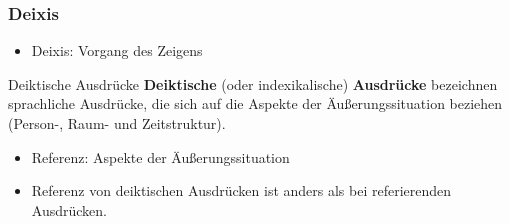 \begin{frame}
\frametitle{Deixis}

\begin{itemize}
	\item Deixis: Vorgang des Zeigens
\end{itemize}

	\begin{block}{Deiktische Ausdrücke}
	\textbf{Deiktische} (oder indexikalische) \textbf{Ausdrücke} bezeichnen sprachliche Ausdrücke, die sich auf die Aspekte der Äu\ss{}erungssituation beziehen (Person-, Raum- und Zeitstruktur).
	\end{block}

\begin{itemize}

		\item Referenz: Aspekte der Äu\ss{}erungssituation
		\medskip
		\item Referenz von deiktischen Ausdrücken ist anders als bei referierenden Ausdrücken.
\end{itemize}

\end{frame}



